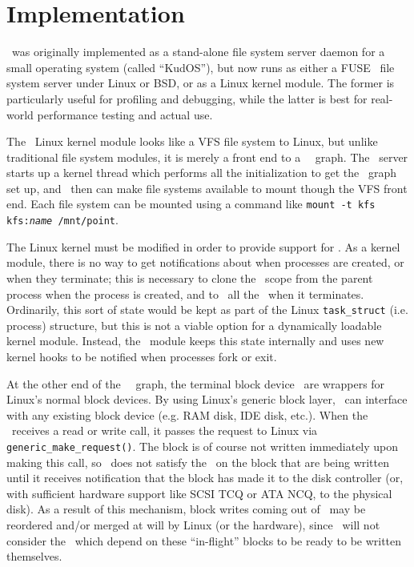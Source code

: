 \section{Implementation}
\label{sec:implementation}

\Kudos\ was originally implemented as a stand-alone file system server daemon
for a small operating system (called ``KudOS''), but now runs as either a
FUSE~\cite{fuse} file system server under Linux or BSD, or as a Linux kernel
module. The former is particularly useful for profiling and debugging, while the
latter is best for real-world performance testing and actual use. 


The \Kudos\ Linux kernel module looks like a VFS file system to Linux, but
unlike traditional file system modules,
it is merely a front end to a \Kudos\ \module\ graph. The \Kudos\
server starts up a kernel thread which performs all the initialization to get
the \module\ graph set up, and \modules\ then can make file systems available to
mount though the VFS front end. Each file system can be
mounted using a
command like \mbox{\texttt{mount -t kfs kfs:\textit{name} /mnt/point}}.

The Linux kernel must be modified in order to
provide support for \opgroups.  As a kernel module, there is no way to
get notifications about when processes are created, or when they terminate; this
is necessary to clone the \opgroup\ scope 
from the parent process when the process is created, and to \abandon\ all
the \opgroups\ when it terminates. Ordinarily, this sort of state would be kept
as part of the Linux \texttt{task\_struct} (i.e. process) structure, but this is
not a viable option for a dynamically loadable kernel module. Instead, the
\Kudos\ module keeps this state internally and uses new kernel hooks
to be notified when processes fork or exit. 

At the other end of the \Kudos\ \module\ graph, the terminal block device
\modules\ are wrappers for Linux's normal block devices. By using Linux's
generic block layer, \Kudos\ can interface with any existing block device (e.g.
RAM disk, IDE disk, etc.). When the \module\ receives a read or write call, it
passes the request to Linux via \texttt{generic\_make\_request()}. The block is
of course not written immediately upon making this call, so \Kudos\ does not
satisfy the \chdescs\ on the block that are being written until it receives
notification that the block has made it to the disk controller (or, with
sufficient hardware support like SCSI TCQ or ATA NCQ, to the physical disk). As
a result of this mechanism, block writes coming out of \Kudos\ may be reordered
and/or merged at will by Linux (or the hardware), since \Kudos\ will not
consider the \chdescs\ which depend on these ``in-flight'' blocks to be ready to
be written themselves.

